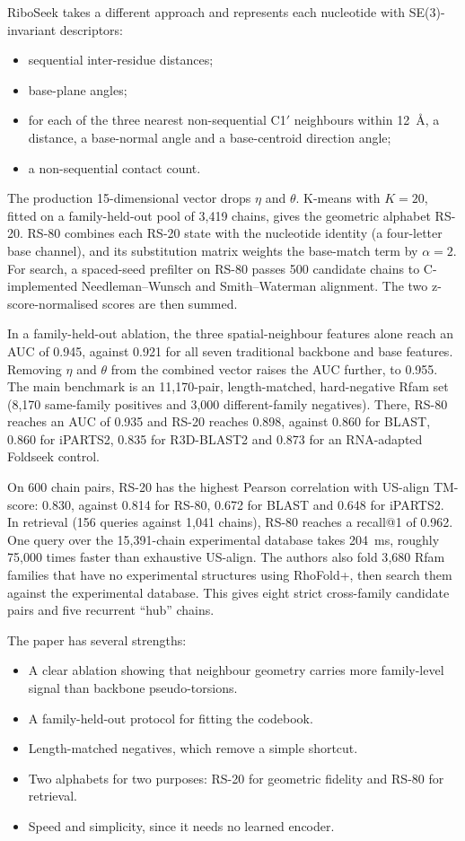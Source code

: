 \documentclass{FastFyp}
\begin{document}
RiboSeek takes a different approach and represents each nucleotide with SE(3)-invariant descriptors:
\begin{itemize}
\item sequential inter-residue distances;
\item base-plane angles;
\item for each of the three nearest non-sequential C1$'$ neighbours within 12~\AA, a distance, a base-normal angle and a base-centroid direction angle;
\item a non-sequential contact count.
\end{itemize}

The production 15-dimensional vector drops $\eta$ and $\theta$. K-means with $K = 20$, fitted on a family-held-out pool of 3{,}419 chains, gives the geometric alphabet RS-20. RS-80 combines each RS-20 state with the nucleotide identity (a four-letter base channel), and its substitution matrix weights the base-match term by $\alpha = 2$. For search, a spaced-seed prefilter on RS-80 passes 500 candidate chains to C-implemented Needleman--Wunsch and Smith--Waterman alignment. The two z-score-normalised scores are then summed.

In a family-held-out ablation, the three spatial-neighbour features alone reach an AUC of 0.945, against 0.921 for all seven traditional backbone and base features. Removing $\eta$ and $\theta$ from the combined vector raises the AUC further, to 0.955. The main benchmark is an 11{,}170-pair, length-matched, hard-negative Rfam set (8{,}170 same-family positives and 3{,}000 different-family negatives). There, RS-80 reaches an AUC of 0.935 and RS-20 reaches 0.898, against 0.860 for BLAST, 0.860 for iPARTS2, 0.835 for R3D-BLAST2 and 0.873 for an RNA-adapted Foldseek control.

On 600 chain pairs, RS-20 has the highest Pearson correlation with US-align TM-score: 0.830, against 0.814 for RS-80, 0.672 for BLAST and 0.648 for iPARTS2. In retrieval (156 queries against 1{,}041 chains), RS-80 reaches a recall@1 of 0.962. One query over the 15{,}391-chain experimental database takes 204~ms, roughly 75{,}000 times faster than exhaustive US-align. The authors also fold 3{,}680 Rfam families that have no experimental structures using RhoFold+, then search them against the experimental database. This gives eight strict cross-family candidate pairs and five recurrent ``hub'' chains.

The paper has several strengths:
\begin{itemize}
\item A clear ablation showing that neighbour geometry carries more family-level signal than backbone pseudo-torsions.
\item A family-held-out protocol for fitting the codebook.
\item Length-matched negatives, which remove a simple shortcut.
\item Two alphabets for two purposes: RS-20 for geometric fidelity and RS-80 for retrieval.
\item Speed and simplicity, since it needs no learned encoder.
\end{itemize}
\end{document}
